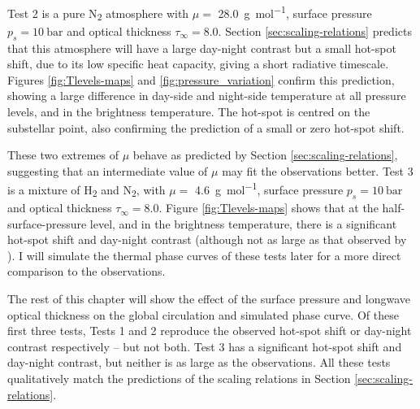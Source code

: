 Test 2 is a pure N\textsubscript{2} atmosphere with $\mu =$ \SI{28.0}{\gram\per\mol}, surface pressure $p_{s} = 10\ \mathrm{bar}$ and optical thickness $\tau_{\infty}= 8.0$. Section \ref{sec:scaling-relations} predicts that this atmosphere will have a large day-night contrast but a small hot-spot shift, due to its low specific heat capacity, giving a short radiative timescale. Figures \ref{fig:Tlevels-maps} and \ref{fig:pressure_variation} confirm this prediction, showing a large difference in day-side and night-side temperature at all pressure levels, and in the brightness temperature. The hot-spot is centred on the substellar point, also confirming the prediction of a small or zero hot-spot shift.

These two extremes of $\mu$ behave as predicted by Section \ref{sec:scaling-relations}, suggesting that an intermediate value of $\mu$ may fit the observations better. Test 3 is a mixture of H\textsubscript{2} and N\textsubscript{2}, with $\mu =$ \SI{4.6}{\gram\per\mole}, surface pressure $p_{s} = 10\ \mathrm{bar}$ and optical thickness $\tau_{\infty}= 8.0$. Figure \ref{fig:Tlevels-maps} shows that at the half-surface-pressure level, and in the brightness temperature, there is a significant hot-spot shift and day-night contrast (although not as large as that observed by \citet{demory201655cnce}). I will simulate the thermal phase curves of these tests later for a more direct comparison to the observations.

The rest of this chapter will show the effect of the surface pressure and longwave optical thickness on the global circulation and simulated phase curve. Of these first three tests, Tests 1 and 2 reproduce the observed hot-spot shift or day-night contrast respectively -- but not both. Test 3 has a significant hot-spot shift and day-night contrast, but neither is as large as the observations. All these tests qualitatively match the predictions of the scaling relations in Section \ref{sec:scaling-relations}.

